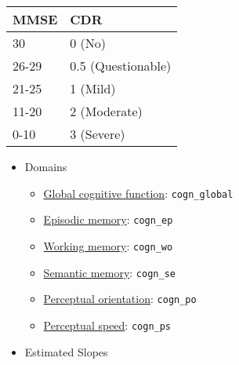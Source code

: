 \documentclass[]{book}
\providecommand{\tightlist}{%
  \setlength{\itemsep}{0pt}\setlength{\parskip}{0pt}}
\begin{document}
\begin{longtable}[]{@{}ll@{}}
\toprule
MMSE & CDR\tabularnewline
\midrule
\endhead
30 & 0 (No)\tabularnewline
26-29 & 0.5 (Questionable)\tabularnewline
21-25 & 1 (Mild)\tabularnewline
11-20 & 2 (Moderate)\tabularnewline
0-10 & 3 (Severe)\tabularnewline
\bottomrule
\end{longtable}

\begin{itemize}
\tightlist
\item
  Domains

  \begin{itemize}
  \tightlist
  \item
    \href{https://www.radc.rush.edu/docs/var/detail.htm?category=Cognition\&subcategory=Global+cognition\&variable=cogn_global}{Global cognitive function}: \texttt{cogn\_global}
  \item
    \href{https://www.radc.rush.edu/docs/var/detail.htm?category=Cognition\&subcategory=Domains\&variable=cogn_ep}{Episodic memory}: \texttt{cogn\_ep}
  \item
    \href{https://www.radc.rush.edu/docs/var/detail.htm?category=Cognition\&subcategory=Domains\&variable=cogn_wo}{Working memory}: \texttt{cogn\_wo}
  \item
    \href{https://www.radc.rush.edu/docs/var/detail.htm?category=Cognition\&subcategory=Domains\&variable=cogn_se}{Semantic memory}: \texttt{cogn\_se}
  \item
    \href{https://www.radc.rush.edu/docs/var/detail.htm?category=Cognition\&subcategory=Domains\&variable=cogn_po}{Perceptual orientation}: \texttt{cogn\_po}
  \item
    \href{https://www.radc.rush.edu/docs/var/detail.htm?category=Cognition\&subcategory=Domains\&variable=cogn_ps}{Perceptual speed}: \texttt{cogn\_ps}
  \end{itemize}
\item
  Estimated Slopes


\end{itemize}
\end{document}
